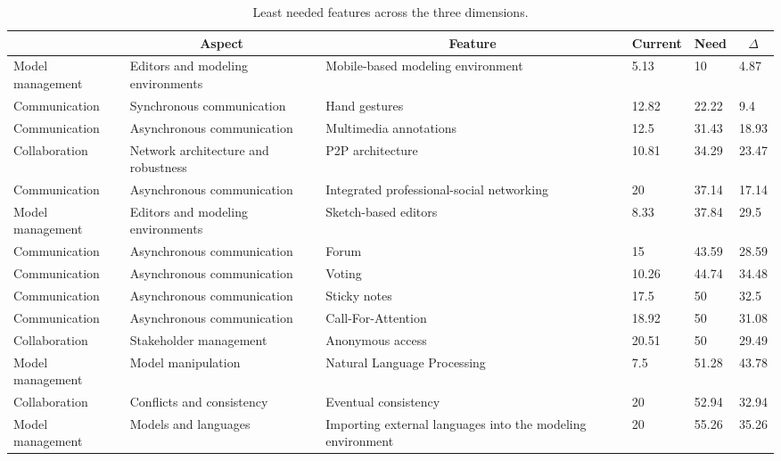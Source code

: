 
  \begin{table*}[]
  \centering
  \notsotiny
  \caption{ Least needed features across the three dimensions.}
\label{tab:least-needed}
\begin{tabular}{|l|l|l|l|l|l|}
  \hline
  \rowcolor[HTML]{C0C0C0}
    \multicolumn{1}{|c|}{Dimension} & \multicolumn{1}{c|}{Aspect} & \multicolumn{1}{c|}{Feature} & \multicolumn{1}{c|}{Current} & \multicolumn{1}{c|}{Need} & \multicolumn{1}{c|}{$\Delta$} \\ \hline
    Model management & Editors and modeling environments & Mobile-based modeling environment & 5.13 & 10 & 4.87 \\ \hline 
Communication & Synchronous communication & Hand gestures & 12.82 & 22.22 & 9.4 \\ \hline 
Communication & Asynchronous communication & Multimedia annotations & 12.5 & 31.43 & 18.93 \\ \hline 
Collaboration & Network architecture and robustness & P2P architecture & 10.81 & 34.29 & 23.47 \\ \hline 
Communication & Asynchronous communication & Integrated professional-social networking & 20 & 37.14 & 17.14 \\ \hline 
Model management & Editors and modeling environments & Sketch-based editors & 8.33 & 37.84 & 29.5 \\ \hline 
Communication & Asynchronous communication & Forum & 15 & 43.59 & 28.59 \\ \hline 
Communication & Asynchronous communication & Voting & 10.26 & 44.74 & 34.48 \\ \hline 
Communication & Asynchronous communication & Sticky notes & 17.5 & 50 & 32.5 \\ \hline 
Communication & Asynchronous communication & Call-For-Attention & 18.92 & 50 & 31.08 \\ \hline 
Collaboration & Stakeholder management & Anonymous access & 20.51 & 50 & 29.49 \\ \hline 
Model management & Model manipulation & Natural Language Processing & 7.5 & 51.28 & 43.78 \\ \hline 
Collaboration & Conflicts and consistency & Eventual consistency & 20 & 52.94 & 32.94 \\ \hline 
Model management & Models and languages & Importing external languages into the modeling environment & 20 & 55.26 & 35.26 \\ \hline 

\end{tabular}
\end{table*}
